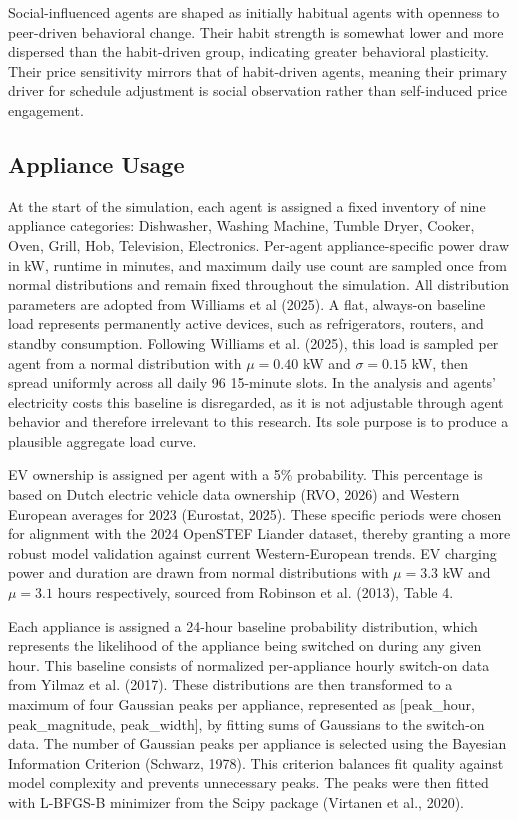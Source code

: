 \documentclass[11pt, a4paper]{article}
\begin{document}
Social-influenced agents are shaped as initially habitual agents with openness to peer-driven behavioral change. Their habit strength is somewhat lower and more dispersed than the habit-driven group, indicating greater behavioral plasticity. Their price sensitivity mirrors that of habit-driven agents, meaning their primary driver for schedule adjustment is social observation rather than self-induced price engagement. 

\subsection{Appliance Usage} \label{subs:usage}

At the start of the simulation, each agent is assigned a fixed inventory of nine appliance categories: Dishwasher, Washing Machine, Tumble Dryer, Cooker, Oven, Grill, Hob, Television, Electronics. Per-agent appliance-specific power draw in kW, runtime in minutes, and maximum daily use count are sampled once from normal distributions and remain fixed throughout the simulation. All distribution parameters are adopted from Williams et al (2025). A flat, always-on baseline load represents permanently active devices, such as refrigerators, routers, and standby consumption. Following Williams et al. (2025), this load is sampled per agent from a normal distribution with $\mu = 0.40$ kW and $\sigma = 0.15$ kW, then spread uniformly across all daily 96 15-minute slots. In the analysis and agents' electricity costs this baseline is disregarded, as it is not adjustable through agent behavior and therefore irrelevant to this research. Its sole purpose is to produce a plausible aggregate load curve. 

EV ownership is assigned per agent with a 5\% probability. This percentage is based on Dutch electric vehicle data ownership (RVO, 2026) and Western European averages for 2023 (Eurostat, 2025). These specific periods were chosen for alignment with the 2024 OpenSTEF Liander dataset, thereby granting a more robust model validation against current Western-European trends. EV charging power and duration are drawn from normal distributions with $\mu = 3.3$ kW and $\mu = 3.1$ hours respectively, sourced from Robinson et al. (2013), Table 4.

Each appliance is assigned a 24-hour baseline probability distribution, which represents the likelihood of the appliance being switched on during any given hour. This baseline consists of normalized per-appliance hourly switch-on data from Yilmaz et al. (2017). These distributions are then transformed to a maximum of four Gaussian peaks per appliance, represented as [peak\_hour, peak\_magnitude, peak\_width], by fitting sums of Gaussians to the switch-on data. The number of Gaussian peaks per appliance is selected using the Bayesian Information Criterion (Schwarz, 1978). This criterion balances fit quality against model complexity and prevents unnecessary peaks. The peaks were then fitted with L-BFGS-B minimizer from the Scipy package (Virtanen et al., 2020).
\end{document}
